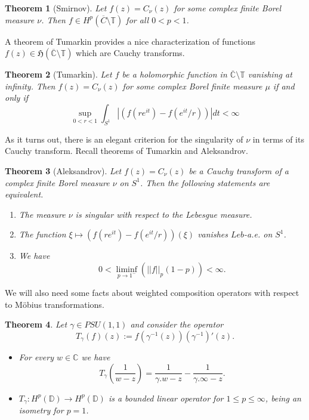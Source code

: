 \documentclass[11pt]{article}
\newtheorem{theorem}{Theorem}[section]
\begin{document}
\begin{theorem}[Smirnov]
	\label{T:Smirnov}
	Let $f(z) = C_\nu(z)$ for some complex finite Borel measure $\nu$. Then $f \in H^p(\overline{C} \setminus \mathbb{T})$ for all $0 < p < 1$.
\end{theorem}

A theorem of Tumarkin provides a nice characterization of functions $f(z) \in \mathfrak{H}(\overline{\mathbb{C}} \setminus \mathbb{T})$ which are Cauchy transforms.

\begin{theorem}[Tumarkin]
	\label{T:Tumarkin}
	Let $f$ be a holomorphic function in $\overline{\mathbb{C}} \setminus \mathbb{T}$ vanishing at infinity. Then $f(z) = C_\nu(z)$ for some complex Borel finite measure $\mu$ if and only if
	\[
	\sup\limits_{0 < r < 1} \int_{S^1} |(f(r e^{it}) - f(e^{it} / r))| dt < \infty
	\]
\end{theorem}

As it turns out, there is an elegant criterion for the singularity of $\nu$ in terms of its Cauchy transform. Recall theorems of Tumarkin and Aleksandrov.

\begin{theorem}[Aleksandrov]
	\label{T:Aleksandrov}
	Let $f(z) = C_\nu(z)$ be a Cauchy transform of a complex finite Borel measure $\nu$ on $S^1$. Then the following statements are equivalent.
	\begin{enumerate}
		\item The measure $\nu$ is singular with respect to the Lebesgue measure.
		\item The function $\xi \mapsto (f(r e^{it}) - f(e^{it} / r))(\xi)$ vanishes $Leb$-a.e. on $S^1$.
		\item We have
		\[
		0 < \liminf_{p \rightarrow 1^-} (||f||_p (1 - p) )< \infty.
		\]
	\end{enumerate}
\end{theorem}

We will also need some facts about weighted composition operators with respect to M\"obius transformations.

\begin{theorem}
	\label{weighted composition ops}
	Let $\gamma \in PSU(1,1)$ and consider the operator
	\[
	T_\gamma(f)(z) := f(\gamma^{-1}(z)) (\gamma^{-1})'(z).
	\] 
	\begin{itemize}
		\item For every $w \in \mathbb{C}$ we have
		\[
		T_\gamma \left( \frac{1}{w - z} \right) = \frac{1}{\gamma.w - z} - \frac{1}{\gamma.\infty - z}.
		\]
		\item $T_\gamma : H^p(\mathbb{D}) \rightarrow H^p(\mathbb{D})$ is a bounded linear operator for $1 \le p \le \infty$, being an isometry for $p = 1$.
	\end{itemize}
\end{theorem}
\end{document}
